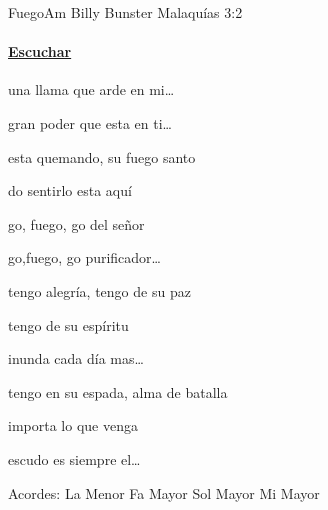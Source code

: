 \documentclass[12pt, spanish]{book}
\begin{document}
    \begin{song}{Fuego}{Am}
        {} %
        {Billy Bunster}
        {Malaquías 3:2} %
        {}
        \ifChordBk
        \paragraph{\mbox{}\hfill\protect\href{https://open.spotify.com/intl-es/track/3NlfXlQdsoJIAufkIMfDz8}{Escuchar}\mbox{}\hfill}
        \fi


        \begin{SBOpGroup}
             una llama que arde en mi\ldots

             gran poder que esta en ti\ldots

             esta quemando, su fuego santo

            do sentirlo esta aquí
        \end{SBOpGroup}


        \begin{SBChorus}
            go, fuego, go del señor

            go,fuego, go purificador\ldots
        \end{SBChorus}


        \begin{SBOpGroup}
             tengo alegría,  tengo de su paz

             tengo de su espíritu

             inunda cada día mas\ldots

             tengo en su espada,  alma de batalla

             importa lo que venga

             escudo es siempre el\ldots
        \end{SBOpGroup}

        \ifChordBk
        \begin{SBOpGroup}
            Acordes:
            \upchord{\Am}\qquad La Menor \hfill
            \upchord{\F}\qquad Fa Mayor \hfill\null\break
            \upchord{\G}\qquad Sol Mayor \hfill
            \upchord{\E}\qquad Mi Mayor \hfill\null\break
        \end{SBOpGroup}
        \fi
    \end{song}
\end{document}

